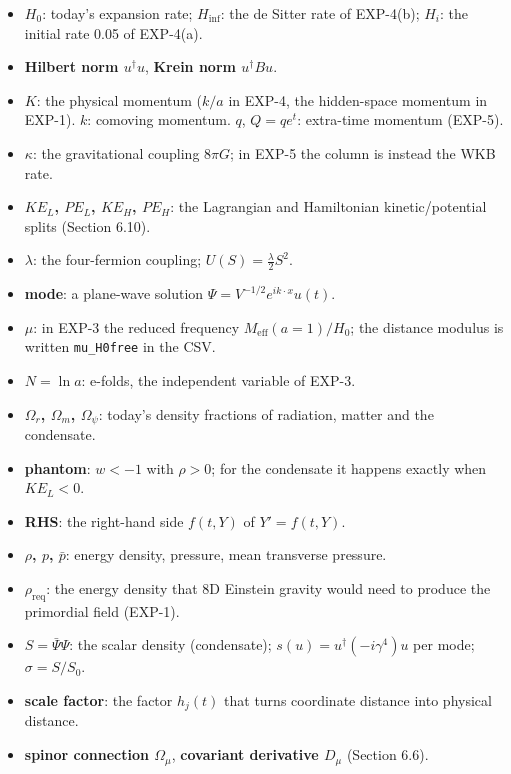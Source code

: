 \documentclass[11pt]{article}
\begin{document}
\begin{itemize}
\item \textbf{$H_0$}: today's expansion rate; \textbf{$H_{\mathrm{inf}}$}: the de Sitter rate of EXP-4(b); \textbf{$H_i$}: the initial rate 0.05 of EXP-4(a).
\item \textbf{Hilbert norm $u^\dagger u$}, \textbf{Krein norm $u^\dagger Bu$}.
\item \textbf{$K$}: the physical momentum ($k/a$ in EXP-4, the hidden-space momentum in EXP-1). \textbf{$k$}: comoving momentum. \textbf{$q$}, \textbf{$Q=qe^t$}: extra-time momentum (EXP-5).
\item \textbf{$\kappa$}: the gravitational coupling $8\pi G$; in EXP-5 the column \texttt{} is instead the WKB rate.
\item \textbf{$KE_L$, $PE_L$, $KE_H$, $PE_H$}: the Lagrangian and Hamiltonian kinetic/potential splits (Section 6.10).
\item \textbf{$\lambda$}: the four-fermion coupling; $U(S)=\frac{\lambda}{2}S^2$.
\item \textbf{mode}: a plane-wave solution $\Psi=V^{-1/2}e^{ik\cdot x}u(t)$.
\item \textbf{$\mu$}: in EXP-3 the reduced frequency $M_{\mathrm{eff}}(a=1)/H_0$; the distance modulus is written \texttt{mu\_H0fre\allowbreak{}e} in the CSV.
\item \textbf{$N=\ln a$}: e-folds, the independent variable of EXP-3.
\item \textbf{$\Omega_r$, $\Omega_m$, $\Omega_\psi$}: today's density fractions of radiation, matter and the condensate.
\item \textbf{phantom}: $w<-1$ with $\rho>0$; for the condensate it happens exactly when $KE_L<0$.
\item \textbf{RHS}: the right-hand side $f(t,Y)$ of $Y'=f(t,Y)$.
\item \textbf{$\rho$, $p$, $\bar p$}: energy density, pressure, mean transverse pressure.
\item \textbf{$\rho_{\mathrm{req}}$}: the energy density that 8D Einstein gravity would need to produce the primordial field (EXP-1).
\item \textbf{$S=\bar\Psi\Psi$}: the scalar density (condensate); \textbf{$s(u)=u^\dagger(-i\gamma^4)u$} per mode; \textbf{$\sigma=S/S_0$}.
\item \textbf{scale factor}: the factor $h_j(t)$ that turns coordinate distance into physical distance.
\item \textbf{spinor connection $\Omega_\mu$}, \textbf{covariant derivative $D_\mu$} (Section 6.6).

\end{itemize}
\end{document}
